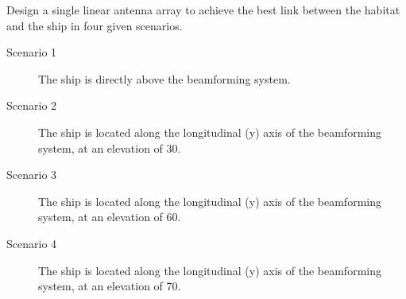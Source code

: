 \documentclass{article}[a4paper]
\begin{document}
Design a single linear antenna array to achieve the best link between the habitat and the ship in four given scenarios.
\begin{description}
	\item[Scenario 1] The ship is directly above the beamforming system.
	\item[Scenario 2] The ship is located along the longitudinal (y) axis of the beamforming system, at an elevation of 30\textdegree.
	\item[Scenario 3] The ship is located along the longitudinal (y) axis of the beamforming system, at an elevation of 60\textdegree.
	\item[Scenario 4] The ship is located along the longitudinal (y) axis of the beamforming system, at an elevation of 70\textdegree.
\end{description}
\end{document}
